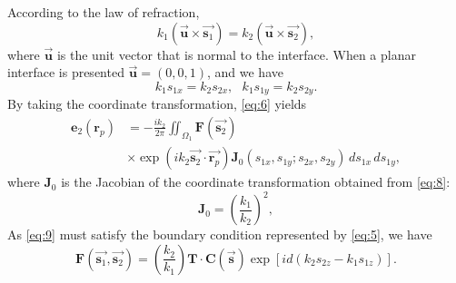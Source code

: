 \documentclass[9pt,twocolumn,twoside]{osajnl}
\begin{document}
According to the law of refraction,
\begin{equation}\label{eq:7}
	k_1(\vec{\textbf{u}}\times\vec{\textbf{s}_1})=k_2(\vec{\textbf{u}}\times\vec{\textbf{s}_2}),
\end{equation}
where $\vec{\textbf{u}}$ is the unit vector that is normal to the interface. When a planar interface is presented $\vec{\textbf{u}}=(0,0,1)$, and we have
\begin{equation}\label{eq:8}
	k_1s_{1x}=k_2s_{2x},\,\,\,\,
	k_1s_{1y}=k_2s_{2y}.
\end{equation} 
By taking the coordinate transformation, \eqref{eq:6} yields
\begin{equation}\label{eq:9}
	\begin{aligned}
		\mathbf{e}_2(\mathbf{r}_p)&=-\frac{ik_2}{2\pi}\iint_{\Omega_1}\mathbf{F}(\vec{\mathbf{s}_2})\\
		&\times\exp(ik_2\vec{\mathbf{s}_2}\cdot\vec{\mathbf{r}_p})\mathbf{J}_0(s_{1x},s_{1y};s_{2x},s_{2y})\,ds_{1x}\,ds_{1y},		
	\end{aligned}
\end{equation}
where $\mathbf{J}_0$ is the Jacobian of the coordinate transformation obtained from \eqref{eq:8}:
\begin{equation}\label{eq:10}
	\mathbf{J}_0=\left(\frac{k_1}{k_2}\right)^2,
\end{equation}
As \eqref{eq:9} must satisfy the boundary condition represented by \eqref{eq:5}, we have
\begin{equation}\label{eq:11}
	\mathbf{F}(\vec{\mathbf{s}_1},\vec{\mathbf{s}_2})=(\frac{k_2}{k_1})\mathbf{T}\cdot\mathbf{C}(\vec{\mathbf{s}})\exp[id(k_2s_{2z}-k_1s_{1z})].
\end{equation}
\end{document}
